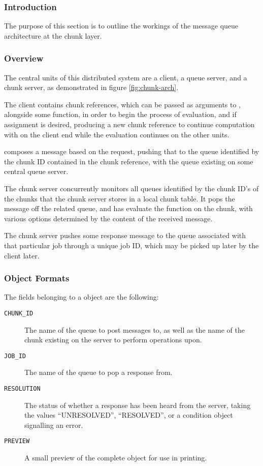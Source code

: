 \subsubsection{Introduction}

The purpose of this section is to outline the workings of the message queue
architecture at the chunk layer.

\subsubsection{Overview}

The central units of this distributed system are a client, a queue server, and
a chunk server, as demonstrated in figure \cref{fig:chunk-arch}.

The client contains chunk references, which can be passed as arguments to
, alongside some function, in order to begin the
process of evaluation, and if assignment is desired, producing a new chunk
reference to continue computation with on the client end while the evaluation
continues on the other units.

 composes a message based on the request, pushing that
to the queue identified by the chunk ID contained in the chunk reference, with
the queue existing on some central queue server.

The chunk server concurrently monitors all queues identified by the chunk ID's
of the chunks that the chunk server stores in a local chunk table.
It pops the message off the related queue, and has 
evaluate the function on the chunk, with various options determined by the
content of the received message.

The chunk server pushes some response message to the queue associated with that
particular job through a unique job ID, which may be picked up later by the
client later.


\subsubsection{Object Formats}
The fields belonging to a  object are the following:
\begin{description}
	\item[\texttt{CHUNK\_ID}] The name of the queue to post messages to, as
		well as the name of the chunk existing on the server to perform
		operations upon.
	\item[\texttt{JOB\_ID}] The name of the queue to pop a response from.
	\item[\texttt{RESOLUTION}] The status of whether a response has been
		heard from the server, taking the values ``UNRESOLVED'',
		``RESOLVED'', or a condition object signalling an error.
	\item[\texttt{PREVIEW}] A small preview of the complete object for use
		in printing.
\end{description}

